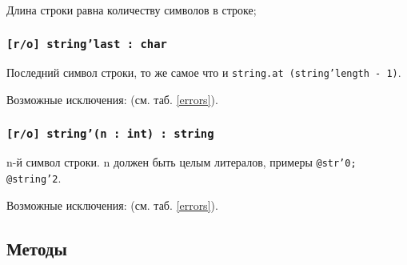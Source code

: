 Длина строки равна количеству символов в строке;

\subsubsection{\texttt{[r/o] string'last : char}}

Последний символ строки, то же самое что и \texttt{string.at (string'length - 1)}.

Возможные исключения:  (см. таб. \ref{errors}).

\subsubsection{\texttt{[r/o] string'(n : int) : string}}

n-й символ строки. n должен быть целым литералов, примеры \texttt{@str'0; @string'2}.

Возможные исключения:  (см. таб. \ref{errors}).

\subsection{Методы}

